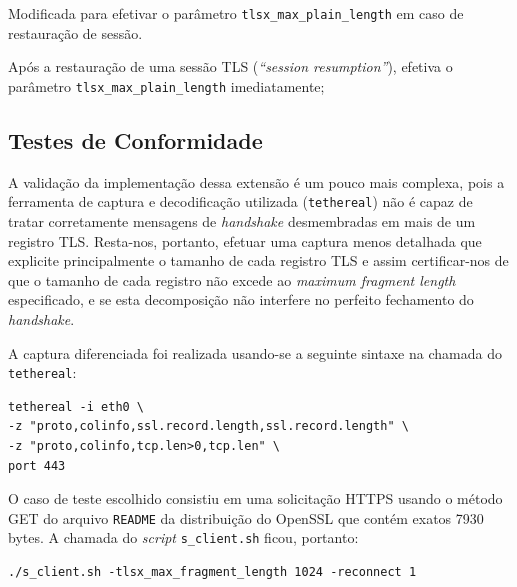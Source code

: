 \begin{description}[\breaklabel\setlabelstyle{\ttfamily}]

\item[s3\_srvr.c::ssl3\_get\_client\_hello]
	Modificada para efetivar o parâmetro \verb|tlsx_max_plain_length| em caso de 
	restauração de sessão. 

\item[s3\_clnt.c::ssl3\_get\_server\_hello]
	Após a restauração de uma sessão TLS (\emph{``session resumption''}), efetiva o 
	parâmetro \verb|tlsx_max_plain_length| imediatamente;

\end{description}

\subsection{Testes de Conformidade}

A validação da implementação dessa extensão é um pouco mais complexa, pois 
a ferramenta de captura e decodificação utilizada (\verb|tethereal|) não é capaz de 
tratar corretamente mensagens de \emph{handshake} desmembradas em mais de um 
registro TLS. Resta-nos, portanto, efetuar uma captura menos detalhada que 
explicite principalmente o tamanho de cada registro TLS e assim certificar-nos 
de que o tamanho de cada registro não excede ao \emph{maximum fragment length}
especificado, e se esta decomposição não interfere no perfeito fechamento do 
\emph{handshake}.

A captura diferenciada foi realizada usando-se a seguinte sintaxe na chamada 
do \verb|tethereal|:

\begin{lstlisting}[caption=Chamada do {\tt tethereal} para o detalhamento dos registros TLS]
tethereal -i eth0 \ 
-z "proto,colinfo,ssl.record.length,ssl.record.length" \ 
-z "proto,colinfo,tcp.len>0,tcp.len" \ 
port 443
\end{lstlisting}

O caso de teste escolhido consistiu em uma solicitação \acs{HTTPS} usando o método 
GET do arquivo \verb|README| da distribuição do OpenSSL que contém exatos 7930 
bytes. A chamada do \emph{script} \verb|s_client.sh| ficou, portanto:

\begin{lstlisting}[caption=Chamada do \texttt{s\_client.sh} para o teste da extensão \acs{MFL}]
./s_client.sh -tlsx_max_fragment_length 1024 -reconnect 1
\end{lstlisting}

